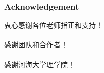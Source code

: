 \begin{frame}[c]
    \frametitle{Acknowledgement}
    \Large{\begin{center}
            衷心感谢各位老师指正和支持！\\
            ~\\
            感谢团队和合作者！\\
            ~\\
            感谢河海大学理学院！\\
        \end{center}}
\end{frame}

\printindex
